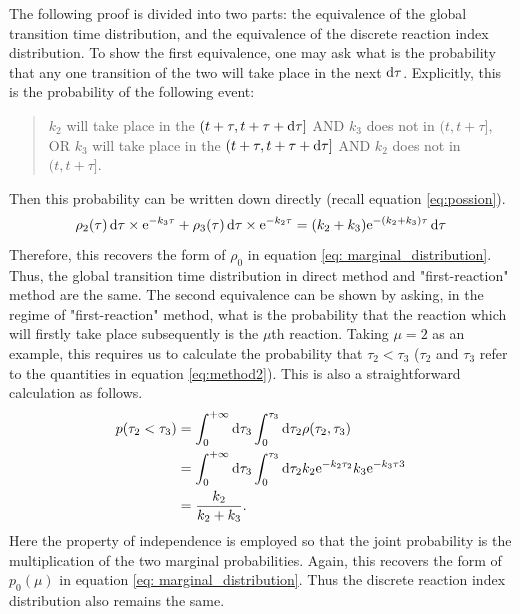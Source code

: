 		The following proof is divided into two parts: the equivalence of the global transition time distribution, and the equivalence of the discrete reaction index distribution.
		To show the first equivalence, one may ask what is the probability that any one transition of the two will take place in the next $\operatorname{d\!} \tau$. Explicitly, this is the probability of the following event:
		\begin{quote}
			$k_2$ will take place in the $(t+\tau, t+\tau+\operatorname{d\!} \tau]$ AND $k_3$ does not in $(t, t+\tau]$, \\ OR $k_3$ will take place in the $(t+\tau, t+\tau+\operatorname{d\!} \tau]$ AND $k_2$ does not in $(t, t+\tau]$.
		\end{quote}
		Then this probability can be written down directly (recall equation \eqref{eq:possion}).
		\begin{equation}
				\rho_2(\tau)\operatorname{d\!}\tau \times \mathrm{e}^{-k_3\tau} + 
				\rho_3(\tau)\operatorname{d\!}\tau \times \mathrm{e}^{-k_2\tau} 
				= (k_2 + k_3) \mathrm{e}^{-(k_2+k_3)\tau} \operatorname{d\!}\tau
		\end{equation}
		Therefore, this recovers the form of $\rho_0$ in equation \eqref{eq: marginal_distribution}. Thus, the global transition time distribution in direct method and "first-reaction" method are the same.
		The second equivalence can be shown by asking, in the regime of "first-reaction" method, what is the probability that the reaction which will firstly take place subsequently is the $\mu$th reaction. Taking $\mu=2$ as an example, this requires us to calculate the probability that $\tau_2<\tau_3$ ($\tau_2$ and $\tau_3$ refer to the quantities in equation \eqref{eq:method2}). This is also a straightforward calculation as follows.
		\begin{equation}
			\begin{aligned}
				p(\tau_2<\tau_3) &= \int_0^{+\infty} \operatorname{d\!} \tau_3 \int_0^{\tau_3} \operatorname{d\!} \tau_2 \rho(\tau_2,\tau_3) \\
				&=\int_0^{+\infty}\operatorname{d\!}\tau_3\int_0^{\tau_3}\operatorname{d\!}\tau_2 k_2\mathrm{e}^{-k_2\tau_2}k_3\mathrm{e}^{-k_3\tau3}\\
				&=\frac{k_2}{k_2+k_3}.
			\end{aligned}
		\end{equation}
		Here the property of independence is employed so that the joint probability is the multiplication of the two marginal probabilities.
		Again, this recovers the form of $p_0(\mu)$ in equation \eqref{eq: marginal_distribution}. Thus the discrete reaction index distribution also remains the same.

